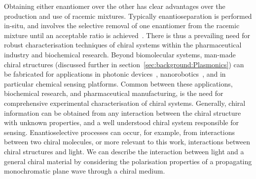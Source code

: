 Obtaining either enantiomer over the other has clear advantages over the production and use of racemic mixtures. Typically enantioseparation is performed in-situ, and involves the selective removal of one enantiomer from the racemic mixture until an acceptable ratio is achieved~\cite{Nguyen2006}. There is thus a prevailing need for robust characterisation techniques of chiral systems within the pharmaceutical industry and biochemical research. 
Beyond biomolecular systems, man-made chiral structures (discussed further in section~\ref{sec:background:Plasmonics}) can be fabricated for applications in photonic devices~\cite{Rizza2015, Esposito2016, Hou2016}, nanorobotics~\cite{Urban2015, Schamel2013a}, and in particular chemical sensing platforms. Common between these applications, biochemical research, and pharmaceutical manufacturing, is the need for comprehensive experimental characterisation of chiral systems. Generally, chiral information can be obtained from any interaction between the chiral structure with unknown properties, and a well understood chiral system responsible for sensing. Enantioselective processes can occur, for example, from interactions between two chiral molecules, or more relevant to this work, interactions between chiral structures and light. We can describe the interaction between light and a general chiral material by considering the polarisation properties of a propagating monochromatic plane wave through a chiral medium.


